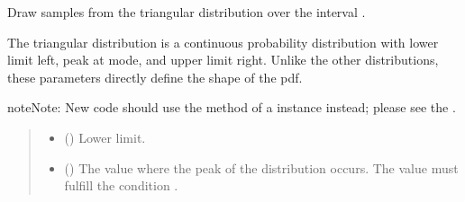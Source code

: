 \documentclass[letterpaper,10pt,english]{sphinxmanual}
\begin{document}
\begin{fulllineitems}
\label{\detokenize{metilda.controllers:metilda.controllers.pitch_art_wizard.triangular}}
\pysigstartsignatures
{}
\pysigstopsignatures
\sphinxAtStartPar
Draw samples from the triangular distribution over the
interval .

\sphinxAtStartPar
The triangular distribution is a continuous probability
distribution with lower limit left, peak at mode, and upper
limit right. Unlike the other distributions, these parameters
directly define the shape of the pdf.

\begin{sphinxadmonition}{note}{Note:}
\sphinxAtStartPar
New code should use the 
method of a  instance instead;
please see the .
\end{sphinxadmonition}
\begin{quote}\begin{description}
\begin{itemize}
\item {} 
\sphinxAtStartPar
{} () \textendash{} Lower limit.

\item {} 
\sphinxAtStartPar
{} () \textendash{} The value where the peak of the distribution occurs.
The value must fulfill the condition .


\end{itemize}
\end{description}
\end{quote}
\end{fulllineitems}
\end{document}
